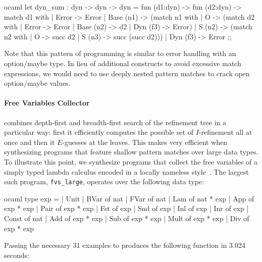 \begin{center}
  \begin{cminted}{ocaml}
let dyn_sum : dyn -> dyn -> dyn =
  fun (d1:dyn) ->
    fun (d2:dyn) ->
      match d1 with
        | Error -> Error
        | Base (n1) -> (match n1 with
                          | O -> (match d2 with
                                    | Error -> Error
                                    | Base (n2) -> d2
                                    | Dyn (f3) -> Error)
                          | S (n2) -> (match n2 with
                                         | O -> succ d2
                                         | S (n3) -> succ (succ d2)))
        | Dyn (f3) -> Error
;;
  \end{cminted}
\end{center}

Note that this pattern of programming is similar to error handling with an option/maybe type.
In lieu of additional constructs to avoid excessive match expressions, we would need to use deeply nested pattern matches to crack open option/maybe values.

\paragraph{Free Variables Collector}

\myth{} combines depth-first and breadth-first search of the refinement tree in a particular way: first it efficiently computes the possible set of $I$-refinement all at once and then it $E$-guesses at the leaves.
This makes \myth{} very efficient when synthesizing programs that feature shallow pattern matches over large data types.
To illustrate this point, we synthesize programs that collect the free variables of a simply typed lambda calculus encoded in a locally nameless style~.
The largest such program, \texttt{fvs\_large}, operates over the following data type:

\begin{center}
  \begin{cminted}{ocaml}
type exp =
  | Unit
  | BVar of nat
  | FVar of nat
  | Lam of nat * exp
  | App of exp * exp
  | Pair of exp * exp
  | Fst of exp
  | Snd of exp
  | Inl of exp
  | Inr of exp
  | Const of nat
  | Add of exp * exp
  | Sub of exp * exp
  | Mult of exp * exp
  | Div of exp * exp
  \end{cminted}
\end{center}

Passing the necessary 31 examples to \myth{} produces the following function in 3.024 seconds:

